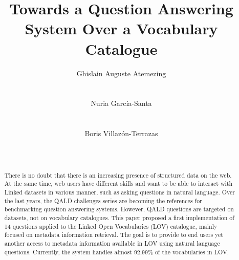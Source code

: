 \documentclass{acm}
\begin{document}


\title{Towards a Question Answering System Over a Vocabulary Catalogue}

\author{
\alignauthor Ghislain Auguste Atemezing\\
       \\
       \\
  \alignauthor Nuria Garc{\'i}a-Santa\\
       \\
       \\
\alignauthor Boris Villaz{\'o}n-Terrazas\\
       \\
       \\
}

\maketitle



\begin{abstract}

There is no doubt that there is an increasing presence of structured data on the web. At the same time, web users have different skills and want to be able to interact with Linked datasets in various manner, such as asking questions in natural language. Over the last years, the QALD challenges series are becoming the references for benchmarking question answering systems. However, QALD questions are targeted on datasets, not on vocabulary catalogues. 
This paper proposed a first implementation of 14 questions applied to the Linked Open Vocabularies (LOV) catalogue, mainly focused on metadata information retrieval. The goal is to provide to end users yet another access to metadata information available in LOV  using natural language questions. Currently, the system handles almost 92,99\% of the vocabularies in LOV.

\end{abstract}
\end{document}
